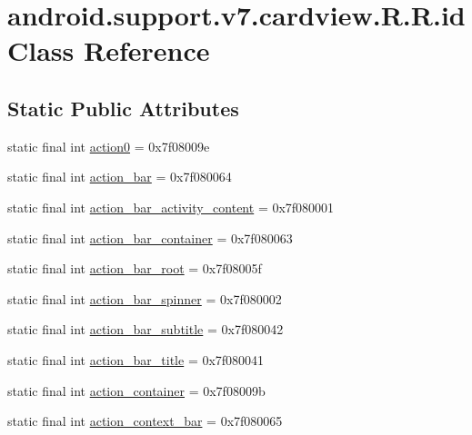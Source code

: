 \hypertarget{classandroid_1_1support_1_1v7_1_1cardview_1_1_r_1_1id}{
\section{android.support.v7.cardview.R.R.id Class Reference}
\label{classandroid_1_1support_1_1v7_1_1cardview_1_1_r_1_1id}
}
\subsection*{Static Public Attributes}
\begin{CompactItemize}
\item 
static final int \hyperlink{classandroid_1_1support_1_1v7_1_1cardview_1_1_r_1_1id_ca49f81d19bad006c2e7f014a67dbb6b}{action0} = 0x7f08009e
\item 
static final int \hyperlink{classandroid_1_1support_1_1v7_1_1cardview_1_1_r_1_1id_4c4113b657366c9226874e8c14244942}{action\_\-bar} = 0x7f080064
\item 
static final int \hyperlink{classandroid_1_1support_1_1v7_1_1cardview_1_1_r_1_1id_65533fee240730b85ed078ca400e5956}{action\_\-bar\_\-activity\_\-content} = 0x7f080001
\item 
static final int \hyperlink{classandroid_1_1support_1_1v7_1_1cardview_1_1_r_1_1id_5afbe27e8e7402eb84cbbbc0d84ed0e4}{action\_\-bar\_\-container} = 0x7f080063
\item 
static final int \hyperlink{classandroid_1_1support_1_1v7_1_1cardview_1_1_r_1_1id_e8c529a6d0cef93a92b86f2cf0ee7fb6}{action\_\-bar\_\-root} = 0x7f08005f
\item 
static final int \hyperlink{classandroid_1_1support_1_1v7_1_1cardview_1_1_r_1_1id_63036d4f8efd6042e46b2750d4fe4451}{action\_\-bar\_\-spinner} = 0x7f080002
\item 
static final int \hyperlink{classandroid_1_1support_1_1v7_1_1cardview_1_1_r_1_1id_dbe6d1e3f4a1033c328579c7086c3de6}{action\_\-bar\_\-subtitle} = 0x7f080042
\item 
static final int \hyperlink{classandroid_1_1support_1_1v7_1_1cardview_1_1_r_1_1id_f121a982c5e6cf89cf579d6d270de0e5}{action\_\-bar\_\-title} = 0x7f080041
\item 
static final int \hyperlink{classandroid_1_1support_1_1v7_1_1cardview_1_1_r_1_1id_bcf2d6da034458a8230bc614a5845438}{action\_\-container} = 0x7f08009b
\item 
static final int \hyperlink{classandroid_1_1support_1_1v7_1_1cardview_1_1_r_1_1id_0af97f61bd6e4797a947f084e39bfb06}{action\_\-context\_\-bar} = 0x7f080065

\end{CompactItemize}
